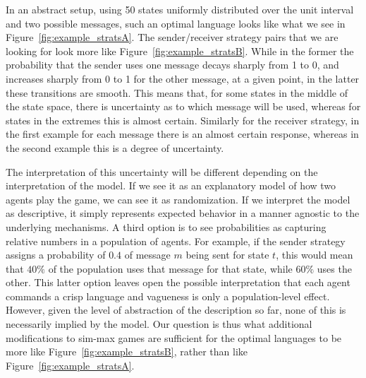 \documentclass[a4paper]{article}
\begin{document}
In an abstract setup, using 50 states uniformly distributed over the unit interval and two possible messages, such an optimal language looks like what we see in Figure~\ref{fig:example_stratsA}.
The sender/receiver strategy pairs that we are looking for look more like Figure~\ref{fig:example_stratsB}.
While in the former the probability that the sender uses one message decays sharply from 1 to 0, and increases sharply from 0 to 1 for the other message, at a given point, in the latter these transitions are smooth.
This means that, for some states in the middle of the state space, there is uncertainty as to which message will be used, whereas for states in the extremes this is almost certain.
Similarly for the receiver strategy, in the first example for each message there is an almost certain response, whereas in the second example this is a degree of uncertainty.

The interpretation of this uncertainty will be different depending on the interpretation of the model.
If we see it as an explanatory model of how two agents play the game, we can see it as randomization.
If we interpret the model as descriptive, it simply represents expected behavior in a manner agnostic to the underlying mechanisms.
A third option is to see probabilities as capturing relative numbers in a population of agents.
For example, if the sender strategy assigns a probability of $0.4$ of message $m$ being sent for state $t$, this would mean that $40\%$ of the population uses that message for that state, while $60\%$ uses the other.
This latter option leaves open the possible interpretation that each agent commands a crisp language and vagueness is only a population-level effect.
However, given the level of abstraction of the description so far, none of this is necessarily implied by the model.
Our question is thus what additional modifications to sim-max games are sufficient for the optimal languages to be more like Figure~\ref{fig:example_stratsB}, rather than like Figure~\ref{fig:example_stratsA}.
\end{document}
